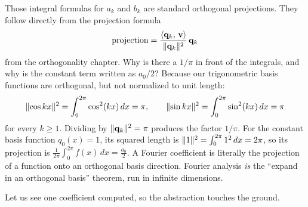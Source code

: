 \begin{focusbox}
Those integral formulas for $a_k$ and $b_k$ are standard orthogonal projections.
They follow directly from the projection formula
\[
  \text{projection} = \frac{\langle \mathbf{q}_k,\, \mathbf{v} \rangle}{\lVert\mathbf{q}_k\rVert^2}\,\mathbf{q}_k
\]
from the orthogonality chapter. Why is there a $1/\pi$ in front of the integrals,
and why is the constant term written as $a_0/2$? Because our trigonometric basis functions
are orthogonal, but not normalized to unit length:
\[
  \lVert\cos kx\rVert^2 = \int_0^{2\pi}\cos^2(kx)\,dx = \pi, \qquad
  \lVert\sin kx\rVert^2 = \int_0^{2\pi}\sin^2(kx)\,dx = \pi
\]
for every $k\ge 1$. Dividing by $\lVert\mathbf{q}_k\rVert^2 = \pi$ produces the factor $1/\pi$.
For the constant basis function $q_0(x)=1$, its squared length is
$\lVert1\rVert^2 = \int_0^{2\pi}1^2\,dx = 2\pi$, so its projection is
$\frac{1}{2\pi}\int_0^{2\pi}f(x)\,dx = \frac{a_0}{2}$. A Fourier coefficient is
literally the projection of a function onto an orthogonal basis direction. Fourier
analysis \emph{is} the ``expand in an orthogonal basis'' theorem, run in infinite dimensions.
\end{focusbox}

Let us see one coefficient computed, so the abstraction touches the ground.

